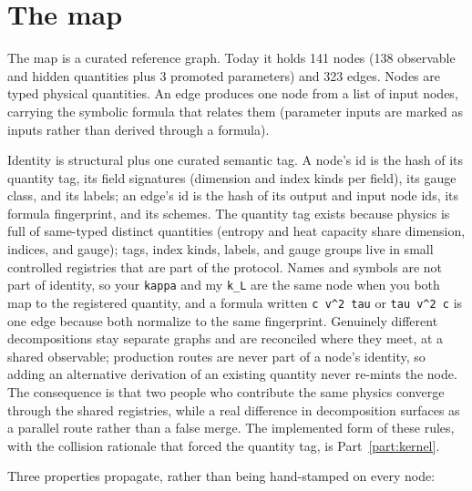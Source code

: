 \documentclass[11pt,a4paper]{article}
\begin{document}
\section{The map}

The map is a curated reference graph. Today it holds 141 nodes (138 observable
and hidden quantities plus 3 promoted parameters) and 323 edges. Nodes are
typed physical quantities. An edge produces one node from a list of input
nodes, carrying the symbolic formula that relates them (parameter inputs are
marked as inputs rather than derived through a formula).

Identity is structural plus one curated semantic tag. A node's id is the hash
of its quantity tag, its field signatures (dimension and index kinds per
field), its gauge class, and its labels; an edge's id is the hash of its output
and input node ids, its formula fingerprint, and its schemes. The quantity tag
exists because physics is full of same-typed distinct quantities (entropy and
heat capacity share dimension, indices, and gauge); tags, index kinds, labels,
and gauge groups live in small controlled registries that are part of the
protocol. Names and symbols are not part of identity, so your \texttt{kappa} and my
\texttt{k\_L} are the same node when you both map to the registered quantity, and a
formula written \texttt{c v\^{}2 tau} or \texttt{tau v\^{}2 c} is one edge because both normalize
to the same fingerprint. Genuinely different decompositions stay separate
graphs and are reconciled where they meet, at a shared observable; production
routes are never part of a node's identity, so adding an alternative
derivation of an existing quantity never re-mints the node. The consequence is
that two people who contribute the same physics converge through the shared
registries, while a real difference in decomposition surfaces as a parallel
route rather than a false merge. The implemented form of these rules, with the
collision rationale that forced the quantity tag, is Part~\ref{part:kernel}.

Three properties propagate, rather than being hand-stamped on every node:
\end{document}
